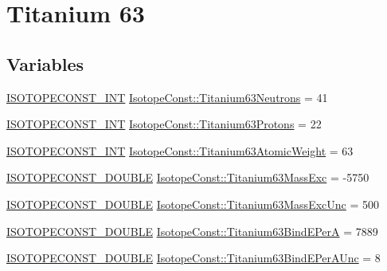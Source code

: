 \hypertarget{group___isotope_const-_titanium-_ti63}{}\section{Titanium 63}
\label{group___isotope_const-_titanium-_ti63}
\subsection*{Variables}
\begin{DoxyCompactItemize}
\item 
\mbox{\hyperlink{group___isotope_const-_macros_ga5f18360b3e99483a35c32d789e62621c}{I\+S\+O\+T\+O\+P\+E\+C\+O\+N\+S\+T\+\_\+\+I\+NT}} \mbox{\hyperlink{group___isotope_const-_titanium-_ti63_ga54da70644a9ab5ef632965539a962629}{Isotope\+Const\+::\+Titanium63\+Neutrons}} = 41
\item 
\mbox{\hyperlink{group___isotope_const-_macros_ga5f18360b3e99483a35c32d789e62621c}{I\+S\+O\+T\+O\+P\+E\+C\+O\+N\+S\+T\+\_\+\+I\+NT}} \mbox{\hyperlink{group___isotope_const-_titanium-_ti63_gaae9af647dcd0ac234239cf20440743d7}{Isotope\+Const\+::\+Titanium63\+Protons}} = 22
\item 
\mbox{\hyperlink{group___isotope_const-_macros_ga5f18360b3e99483a35c32d789e62621c}{I\+S\+O\+T\+O\+P\+E\+C\+O\+N\+S\+T\+\_\+\+I\+NT}} \mbox{\hyperlink{group___isotope_const-_titanium-_ti63_ga81654bff0dc88f5010a5dbbb6c31c038}{Isotope\+Const\+::\+Titanium63\+Atomic\+Weight}} = 63
\item 
\mbox{\hyperlink{group___isotope_const-_macros_ga8f45a7272ce02c0b4c65c44636ed719a}{I\+S\+O\+T\+O\+P\+E\+C\+O\+N\+S\+T\+\_\+\+D\+O\+U\+B\+LE}} \mbox{\hyperlink{group___isotope_const-_titanium-_ti63_gae9085aaafa1fe5d6ef39520b3ec1a166}{Isotope\+Const\+::\+Titanium63\+Mass\+Exc}} = -\/5750
\item 
\mbox{\hyperlink{group___isotope_const-_macros_ga8f45a7272ce02c0b4c65c44636ed719a}{I\+S\+O\+T\+O\+P\+E\+C\+O\+N\+S\+T\+\_\+\+D\+O\+U\+B\+LE}} \mbox{\hyperlink{group___isotope_const-_titanium-_ti63_gad2b4b41af896fbe4b8d87a3613d43960}{Isotope\+Const\+::\+Titanium63\+Mass\+Exc\+Unc}} = 500
\item 
\mbox{\hyperlink{group___isotope_const-_macros_ga8f45a7272ce02c0b4c65c44636ed719a}{I\+S\+O\+T\+O\+P\+E\+C\+O\+N\+S\+T\+\_\+\+D\+O\+U\+B\+LE}} \mbox{\hyperlink{group___isotope_const-_titanium-_ti63_ga61105bc00222c92d299c6b87c2a0841a}{Isotope\+Const\+::\+Titanium63\+Bind\+E\+PerA}} = 7889
\item 
\mbox{\hyperlink{group___isotope_const-_macros_ga8f45a7272ce02c0b4c65c44636ed719a}{I\+S\+O\+T\+O\+P\+E\+C\+O\+N\+S\+T\+\_\+\+D\+O\+U\+B\+LE}} \mbox{\hyperlink{group___isotope_const-_titanium-_ti63_gabd36f72289dd5362be17b389bedeed7a}{Isotope\+Const\+::\+Titanium63\+Bind\+E\+Per\+A\+Unc}} = 8

\end{DoxyCompactItemize}
